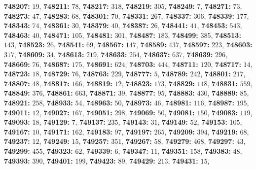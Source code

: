 \textsf{\bfseries 748207:} $19$, \textsf{\bfseries 748211:} $78$, \textsf{\bfseries 748217:} $318$, \textsf{\bfseries 748219:} $305$, \textsf{\bfseries 748249:} $7$, \textsf{\bfseries 748271:} $73$, \textsf{\bfseries 748273:} $47$, \textsf{\bfseries 748283:} $68$, \textsf{\bfseries 748301:} $70$, \textsf{\bfseries 748331:} $267$, \textsf{\bfseries 748337:} $306$, \textsf{\bfseries 748339:} $177$, \textsf{\bfseries 748343:} $74$, \textsf{\bfseries 748361:} $30$, \textsf{\bfseries 748379:} $40$, \textsf{\bfseries 748387:} $26$, \textsf{\bfseries 748441:} $41$, \textsf{\bfseries 748453:} $543$, \textsf{\bfseries 748463:} $40$, \textsf{\bfseries 748471:} $105$, \textsf{\bfseries 748481:} $301$, \textsf{\bfseries 748487:} $183$, \textsf{\bfseries 748499:} $385$, \textsf{\bfseries 748513:} $143$, \textsf{\bfseries 748523:} $26$, \textsf{\bfseries 748541:} $69$, \textsf{\bfseries 748567:} $147$, \textsf{\bfseries 748589:} $437$, \textsf{\bfseries 748597:} $223$, \textsf{\bfseries 748603:} $317$, \textsf{\bfseries 748609:} $34$, \textsf{\bfseries 748613:} $219$, \textsf{\bfseries 748633:} $254$, \textsf{\bfseries 748637:} $637$, \textsf{\bfseries 748639:} $296$, \textsf{\bfseries 748669:} $76$, \textsf{\bfseries 748687:} $175$, \textsf{\bfseries 748691:} $624$, \textsf{\bfseries 748703:} $444$, \textsf{\bfseries 748711:} $120$, \textsf{\bfseries 748717:} $14$, \textsf{\bfseries 748723:} $18$, \textsf{\bfseries 748729:} $76$, \textsf{\bfseries 748763:} $229$, \textsf{\bfseries 748777:} $5$, \textsf{\bfseries 748789:} $242$, \textsf{\bfseries 748801:} $217$, \textsf{\bfseries 748807:} $48$, \textsf{\bfseries 748817:} $166$, \textsf{\bfseries 748819:} $12$, \textsf{\bfseries 748823:} $173$, \textsf{\bfseries 748829:} $118$, \textsf{\bfseries 748831:} $559$, \textsf{\bfseries 748849:} $376$, \textsf{\bfseries 748861:} $663$, \textsf{\bfseries 748871:} $39$, \textsf{\bfseries 748877:} $95$, \textsf{\bfseries 748883:} $430$, \textsf{\bfseries 748889:} $85$, \textsf{\bfseries 748921:} $258$, \textsf{\bfseries 748933:} $54$, \textsf{\bfseries 748963:} $50$, \textsf{\bfseries 748973:} $46$, \textsf{\bfseries 748981:} $116$, \textsf{\bfseries 748987:} $195$, \textsf{\bfseries 749011:} $12$, \textsf{\bfseries 749027:} $167$, \textsf{\bfseries 749051:} $298$, \textsf{\bfseries 749069:} $50$, \textsf{\bfseries 749081:} $150$, \textsf{\bfseries 749083:} $119$, \textsf{\bfseries 749093:} $18$, \textsf{\bfseries 749129:} $7$, \textsf{\bfseries 749137:} $235$, \textsf{\bfseries 749143:} $31$, \textsf{\bfseries 749149:} $52$, \textsf{\bfseries 749153:} $105$, \textsf{\bfseries 749167:} $10$, \textsf{\bfseries 749171:} $162$, \textsf{\bfseries 749183:} $97$, \textsf{\bfseries 749197:} $265$, \textsf{\bfseries 749209:} $394$, \textsf{\bfseries 749219:} $68$, \textsf{\bfseries 749237:} $12$, \textsf{\bfseries 749249:} $15$, \textsf{\bfseries 749257:} $351$, \textsf{\bfseries 749267:} $58$, \textsf{\bfseries 749279:} $468$, \textsf{\bfseries 749297:} $43$, \textsf{\bfseries 749299:} $455$, \textsf{\bfseries 749323:} $62$, \textsf{\bfseries 749339:} $6$, \textsf{\bfseries 749347:} $11$, \textsf{\bfseries 749351:} $158$, \textsf{\bfseries 749383:} $48$, \textsf{\bfseries 749393:} $390$, \textsf{\bfseries 749401:} $199$, \textsf{\bfseries 749423:} $89$, \textsf{\bfseries 749429:} $213$, \textsf{\bfseries 749431:} $15$, 
